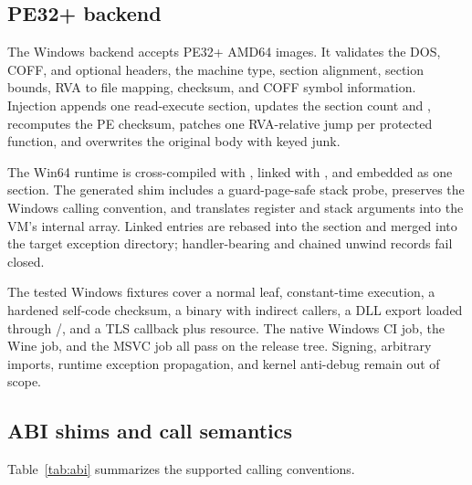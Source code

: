 \subsection{PE32+ backend}

The Windows backend accepts PE32+ AMD64 images. It validates the DOS, COFF, and
optional headers, the machine type, section alignment, section bounds, RVA to file
mapping, checksum, and COFF symbol information. Injection appends one
read-execute  section, updates the section count and
, recomputes the PE checksum, patches one RVA-relative jump per
protected function, and overwrites the original body with keyed junk.

The Win64 runtime is cross-compiled with
, linked with , and
embedded as one section. The generated shim includes a guard-page-safe stack
probe, preserves the Windows calling convention, and translates register and
stack arguments into the VM's internal array. Linked  entries are
rebased into the section and merged into the target exception directory;
handler-bearing and chained unwind records fail closed.

The tested Windows fixtures cover a normal leaf, constant-time execution, a
hardened self-code checksum, a  binary with indirect callers, a
DLL export loaded through /, and a TLS
callback plus  resource. The native Windows CI job, the Wine job,
and the MSVC  job all pass on the release tree. Signing,
arbitrary imports, runtime exception propagation, and kernel anti-debug remain
out of scope.

\subsection{ABI shims and call semantics}

Table~\ref{tab:abi} summarizes the supported calling conventions.

